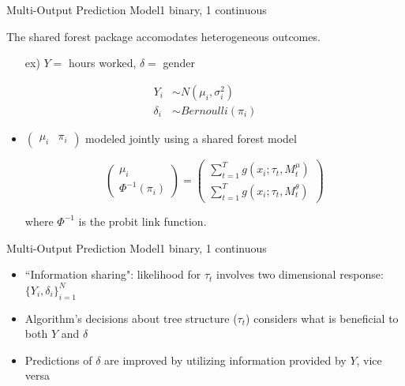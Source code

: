 \documentclass{beamer}
\begin{document}
\begin{frame}{Multi-Output Prediction Model}{1 binary, 1 continuous }

The shared forest package accomodates heterogeneous outcomes. 
\begin{itemize}
\item[ex)] $Y = $ hours worked, $\delta = $ gender
\end{itemize}
\begin{align*}
Y_i &\sim N(\mu_i, \sigma^2_i) \\
\delta_i &\sim Bernoulli(\pi_i)
\end{align*}

\begin{itemize}
\item $\begin{pmatrix}\mu_i & \pi_i \end{pmatrix}$ modeled jointly using a shared forest model

$$\begin{pmatrix}\mu_i \\ \Phi^{-1}(\pi_i) \end{pmatrix} = 
\begin{pmatrix}\sum_{t=1}^T g(x_i ; \tau_t, M^{\mu}_t)\\%
\sum_{t=1}^T g(x_i ; \tau_t, M^{\theta}_t)%
\end{pmatrix} $$

where $\Phi^{-1}$ is the probit link function.
\end{itemize}
\end{frame}


\begin{frame}{Multi-Output Prediction Model}{1 binary, 1 continuous }
\begin{itemize}
\item ``Information sharing": likelihood for $\tau_t$ involves two dimensional response: $\{Y_i, \delta_i\}_{i = 1}^N$
\item Algorithm's decisions about tree structure ($\tau_t$) considers what is beneficial to both $Y$ and $\delta$
\item Predictions of $\delta$ are improved by utilizing information provided by $Y$, vice versa
\end{itemize}
\end{frame}
\end{document}
